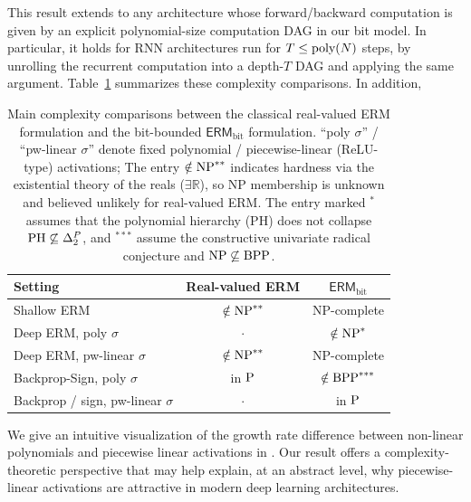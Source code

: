 \documentclass{article}
\theoremstyle{plain}
\theoremstyle{definition}
\theoremstyle{remark}
\begin{document}
This result extends to any architecture whose forward/backward computation is
given by an explicit polynomial-size computation DAG in our bit model.
In particular, it holds for RNN architectures run for $T\le \textnormal{poly}(N)$ steps, by
unrolling the recurrent computation into a depth-$T$ DAG and applying the same
argument.
Table~\ref{tab:main-summary} summarizes these complexity comparisons. In addition,
\begin{table}[h]
	\centering
	\small
	\setlength{\tabcolsep}{4pt}
	\begin{tabular}{@{}lcc@{}}
			\toprule
			\textbf{Setting} & \textbf{Real-valued ERM} & \textbf{$\mathsf{ERM}_{\text{bit}}$} \\
			\midrule
			Shallow ERM & $\notin \textnormal{NP}^{\ast\ast}$ & NP-complete \\
			Deep ERM, poly $\sigma$ & $\cdot$ & $\notin \textnormal{NP}^{\ast}$ \\
			Deep ERM, pw-linear $\sigma$ &  $\notin \textnormal{NP}^{\ast\ast}$ & NP-complete \\
			Backprop-Sign, poly $\sigma$ & in $\textnormal{P}$  & $\notin \textnormal{BPP}^{\ast\ast\ast}$ \\
			Backprop / sign, pw-linear $\sigma$ & $\cdot$ & in $\textnormal{P}$ \\
			\bottomrule
		\end{tabular}
	\caption{Main complexity comparisons between the classical real-valued ERM
			formulation and the bit-bounded $\mathsf{ERM}_{\text{bit}}$ formulation.
			``poly $\sigma$'' / ``pw-linear $\sigma$'' denote fixed polynomial /
			piecewise-linear (ReLU-type) activations; The entry $\notin \textnormal{NP}^{\ast\ast}$ indicates hardness via
			the existential theory of the reals ($\exists\mathbb{R}$), so NP membership
			is unknown and believed unlikely for real-valued ERM. The entry marked
			${}^{\ast}$ assumes that the polynomial hierarchy (PH) does not collapse $\textnormal{PH} \not \subseteq \Delta^P_2$, and			${}^{\ast\ast\ast}$ assume the constructive univariate radical conjecture and $\textnormal{NP}\not\subseteq\textnormal{BPP}$.}
	\label{tab:main-summary}
\end{table}
We give an intuitive visualization of the growth rate difference between non-linear polynomials and piecewise linear activations in . Our result offers a complexity-theoretic perspective that may help explain, at an abstract level, why piecewise-linear activations are attractive in modern deep learning architectures.
\end{document}
